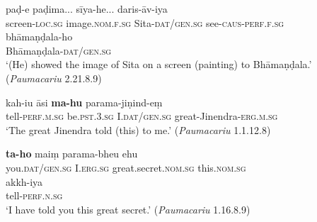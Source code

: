 \documentclass[output=paper,
modfonts
]{LSP/langsci}
\begin{document}
  
\begin{exe}
\ex\label{ex:nop}
\begin{xlist}
\ex\label{ex:pade}\gll paḍ-e paḍima... sīya-he... daris-āv-iya \\
screen-\textsc{loc.sg} image.\textsc{nom.f.sg} Sita-\textsc{dat/gen.sg} see-\textsc{caus-perf.f.sg} \\

\gll bhāmaṇḍala-ho \\
Bhāmaṇḍala-\textsc{dat/gen.sg} \\
\glt `(He) showed the image of Sita on a screen (painting) to Bhāmaṇḍala.' (\textit{Paumacariu} 2.21.8.9)

\ex\label{ex:kahiu}\gll kah-iu āsi \textbf{ma-hu} parama-jiṇind-eṃ \\ tell-\textsc{perf.m.sg} be.\textsc{pst.3.sg} I.\textsc{dat/gen.sg} great-Jinendra-\textsc{erg.m.sg} \\
\glt `The great Jinendra told (this) to me.' (\textit{Paumacariu}  1.1.12.8)

\ex\label{ex:tahomaim}\gll \textbf{ta-ho}  maiṃ  parama-bheu ehu\\
you.\textsc{dat/gen.sg} I.\textsc{erg.sg} great.secret.\textsc{nom.sg} this.\textsc{nom.sg}\\

\gll akkh-iya \\
tell-\textsc{perf.n.sg} \\
\glt `I have told you this great secret.' (\textit{Paumacariu}  1.16.8.9)
\end{xlist}
\end{exe}
\end{document}
